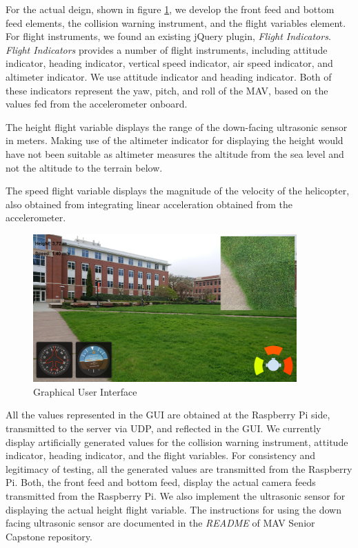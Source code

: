 \documentclass[onecolumn, oneside, letterpaper, draftclsnofoot, 10pt, compsoc]{IEEEtran}
\begin{document}
\noindent
\newline
For the actual deign, shown in figure \ref{fig:UI2}, we develop the front feed and bottom feed elements, the collision warning instrument, and the flight variables element. For flight instruments, we found an existing jQuery plugin, \textit{Flight Indicators}. \textit{Flight Indicators} provides a number of flight instruments, including attitude indicator, heading indicator, vertical speed indicator, air speed indicator, and altimeter indicator. We use attitude indicator and heading indicator. Both of these indicators represent the yaw, pitch, and roll of the MAV, based on the values fed from the accelerometer onboard.

\noindent
\newline
The height flight variable displays the range of the down-facing ultrasonic sensor in meters. Making use of the altimeter indicator for displaying the height would have not been suitable as altimeter measures the altitude from the sea level and not the altitude to the terrain below.

\noindent
\newline
The speed flight variable displays the magnitude of the velocity of the helicopter, also obtained from integrating linear acceleration obtained from the accelerometer.

\begin{figure}[h]
    \centering
    \includegraphics[width=0.9\textwidth]{graphics/ui2.png}
    \caption{Graphical User Interface}
    \label{fig:UI2}
\end{figure}

\noindent
\newline
All the values represented in the GUI are obtained at the Raspberry Pi side, transmitted to the server via UDP, and reflected in the GUI. We currently display artificially generated values for the collision warning instrument, attitude indicator, heading indicator, and the flight variables. For consistency and legitimacy of testing, all the generated values are transmitted from the Raspberry Pi. Both, the front feed and bottom feed, display the actual camera feeds transmitted from the Raspberry Pi. We also implement the ultrasonic sensor for displaying the actual height flight variable. The instructions for using the down facing ultrasonic sensor are documented in the \textit{README} of MAV Senior Capstone repository.

\clearpage
\medskip


\end{document}
